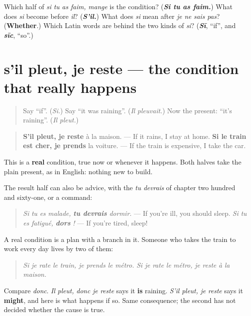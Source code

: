 \begin{tcolorbox}[breakable,colback=teal!4,colframe=teal!35!black,title={Before you move on}]
Which half of \emph{si tu as faim, mange} is the condition? (\emph{\textbf{Si tu as faim.}}) What does \emph{si} become before \emph{il}? (\emph{\textbf{S'il.}}) What does \emph{si} mean after \emph{je ne sais pas}? (\textbf{Whether}.) Which Latin words are behind the two kinds of \emph{si}? (\emph{\textbf{Sī}}, \textquotedblleft{}if\textquotedblright{}, and \emph{\textbf{sīc}}, \textquotedblleft{}so\textquotedblright{}.)
\end{tcolorbox}
\section[s'il pleut, je reste]{s'il pleut, je reste — the condition that really happens}

\label{lesson:FR-C266-sil-pleut}



\begin{quote}
Say \textquotedblleft{}if\textquotedblright{}. (\emph{Si.}) Say \textquotedblleft{}it was raining\textquotedblright{}. (\emph{Il pleuvait.}) Now the present: \textquotedblleft{}it's raining\textquotedblright{}. (\emph{Il pleut.})
\end{quote}

\begin{grammarlens}[title={Grammar Lens: both halves in the present}]
\begin{quote}
\textbf{S'il pleut, je reste} à la maison. — If it rains, I stay at home. \textbf{Si le train est cher, je prends} la voiture. — If the train is expensive, I take the car.
\end{quote}

This is a \textbf{real} condition, true now or whenever it happens. Both halves take the plain present, as in English: nothing new to build.

The result half can also be advice, with the \emph{tu devrais} of chapter two hundred and sixty-one, or a command:

\begin{quote}
\emph{Si tu es malade, \textbf{tu devrais} dormir.} — If you're ill, you should sleep. \emph{Si tu es fatigué, \textbf{dors} !} — If you're tired, sleep!
\end{quote}
\end{grammarlens}

\begin{culture}
A real condition is a plan with a branch in it. Someone who takes the train to work every day lives by two of them:

\begin{quote}
\emph{Si je rate le train, je prends le métro. Si je rate le métro, je reste à la maison.}
\end{quote}

Compare \emph{donc}. \emph{Il pleut, donc je reste} says it \textbf{is} raining. \emph{S'il pleut, je reste} says it \textbf{might}, and here is what happens if so. Same consequence; the second has not decided whether the cause is true.
\end{culture}

